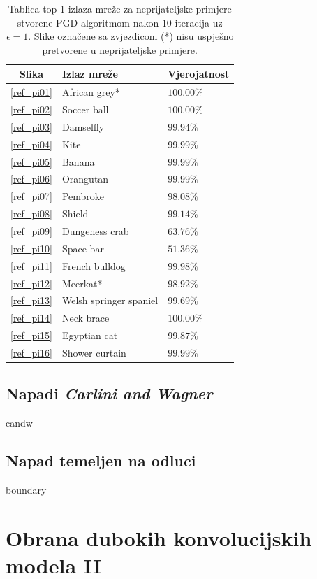 \documentclass[utf8, diplomski]{fer}
\begin{document}
\begin{table}[H]
\centering
\begin{tabular}{@{}cll@{}}
\toprule
Slika & Izlaz mreže & Vjerojatnost \\ \midrule
\ref{ref_pi01} & African grey* & $100.00\%$\\
\ref{ref_pi02} & Soccer ball & $100.00\%$ \\ 
\ref{ref_pi03} & Damselfly & $99.94\%$ \\ 
\ref{ref_pi04} & Kite & $99.99\%$ \\  
\ref{ref_pi05} & Banana & $99.99\%$ \\ 
\ref{ref_pi06} & Orangutan & $99.99\%$ \\ 
\ref{ref_pi07} & Pembroke & $98.08\%$ \\ 
\ref{ref_pi08} & Shield & $99.14\%$ \\ 
\ref{ref_pi09} & Dungeness crab & $63.76\%$ \\ 
\ref{ref_pi10} & Space bar & $51.36\%$ \\ 
\ref{ref_pi11} & French bulldog & $99.98\%$ \\ 
\ref{ref_pi12} & Meerkat* & $98.92\%$ \\ 
\ref{ref_pi13} & Welsh springer spaniel & $99.69\%$ \\ 
\ref{ref_pi14} & Neck brace & $100.00\%$ \\ 
\ref{ref_pi15} & Egyptian cat & $99.87\%$ \\ 
\ref{ref_pi16} & Shower curtain & $99.99\%$ \\ \bottomrule
\end{tabular}
\caption{Tablica top-1 izlaza mreže za neprijateljske primjere stvorene PGD algoritmom nakon $10$ iteracija uz $\epsilon = 1$. Slike označene sa zvjezdicom (*) nisu uspješno pretvorene u neprijateljske primjere.}\label{pgd_predictions}
\end{table}

\section{Napadi \textit{Carlini and Wagner}} candw\citep{Carlini2017TowardsET}
\section{Napad temeljen na odluci} boundary\citep{Brendel2017DecisionBasedAA}

\chapter{Obrana dubokih konvolucijskih modela II}
\end{document}
